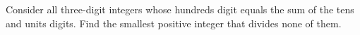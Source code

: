 Consider all three-digit integers whose hundreds digit equals the sum of the tens and units digits. Find the smallest positive integer that divides none of them.
